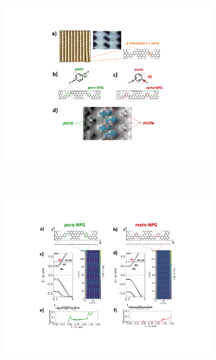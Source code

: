 \begin{figure}
    \centering
    \begin{subfigure}[b]{\textwidth}
    \centering
    \includegraphics[width=\textwidth]{Figures/Fig_1.pdf}
    \caption{}
    \label{studyfig1}
    \end{subfigure}
    ~
    \begin{subfigure}[b]{\textwidth}
    \centering
    \includegraphics[width=\textwidth]{Figures/Fig_2.pdf}
    \caption{}
    \label{studyfig2}
    \end{subfigure}
    ~
    \begin{subfigure}[b]{\textwidth}
    \centering

\end{subfigure}
\end{figure}
